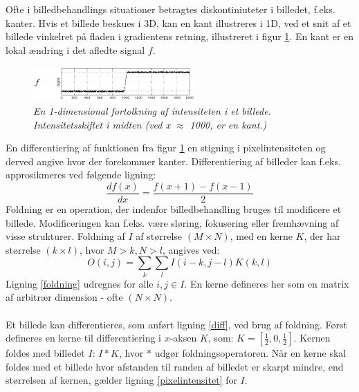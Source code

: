 \\
\\
Ofte i billedbehandlings situationer betragtes diskontiniuteter i billedet, f.eks. kanter.
Hvis et billede beskues i 3D, kan en kant illustreres i 1D, ved et snit af et billede vinkelret på fladen i gradientens retning, illustreret i figur \ref{fig:kant}. En kant er en lokal ændring i det afledte signal $f$.
\noindent
\begin{figure}[H]
    \centering
    \includegraphics[width=0.55\textwidth]{fig/7.png}
     \vspace{-1em}
    \begin{center}        
     \caption{{\footnotesize \textit{
En 1-dimensional fortolkning af intensiteten i et billede. Intensitetsskiftet i midten (ved x $\approx$ 1000, er en kant.)}}}
    \label{fig:kant}
     \end{center}
       \vspace{-2.5em}
  \end{figure}
\noindent
En differentiering af funktionen fra figur \ref{fig:kant} en stigning i pixelintensiteten  og derved angive hvor der forekommer kanter. Differentiering af billeder kan f.eks. approsikmeres ved følgende ligning:
\begin{equation}
\dfrac{df(x)}{dx}=\dfrac{f(x+1)-f(x-1)}{2}
\label{diff}
\end{equation}
Foldning er en operation, der indenfor billedbehandling bruges til modificere et billede. Modificeringen kan f.eks. være sløring, fokusering eller fremhævning af visse strukturer. Foldning af $I$ af størrelse $(M \times N)$, med en kerne $K$, der har størrelse $(k \times l)$, hvor $M > k, N > l$, angives ved:
\begin{equation}
O(i,j) = \sum_{k} \sum_{l} I(i-k, j-l) K(k,l)
\label{foldning}
\end{equation}
Ligning \eqref{foldning} udregnes for alle $i,j \in I$. En kerne defineres her som en matrix af arbitrær dimension - ofte $(N\times N)$. 
\\
\\
Et billede kan differentieres, som anført ligning \eqref{diff}, ved brug af foldning. Først defineres en kerne til differentiering i $x$-aksen $K$, som: $K = [\frac{1}{2}, 0, \frac{1}{2}]$. Kernen foldes med billedet $I$: $I \ast K $, hvor $\ast$ udgør foldningsoperatoren. Når en kerne skal foldes med et billede hvor afstanden til randen af billedet er skarpt mindre, end størrelsen af kernen, gælder ligning \eqref{pixelintensitet} for $I$.
